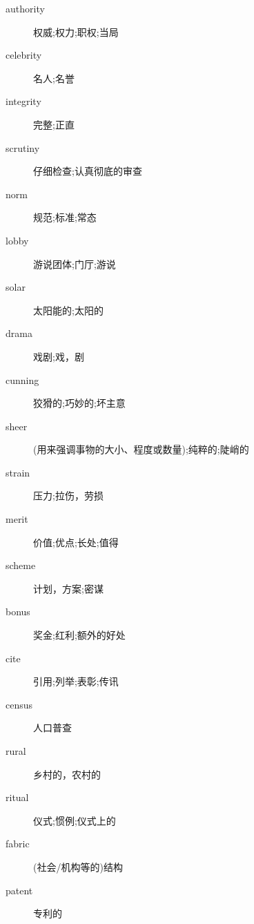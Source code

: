 \documentclass[a4paper, 10pt]{ctexart}
\begin{document}
\begin{multicols*}{2}
\begin{description}
\item[authority] 权威;权力;职权;当局

\item[celebrity] 名人;名誉

\item[integrity] 完整;正直

\item[scrutiny] 仔细检查;认真彻底的审查

\item[norm] 规范;标准;常态

\item[lobby] 游说团体;门厅;游说

\item[solar] 太阳能的;太阳的

\item[drama] 戏剧;戏，剧

\item[cunning] 狡猾的;巧妙的;坏主意

\item[sheer] (用来强调事物的大小、程度或数量);纯粹的;陡峭的

\item[strain] 压力;拉伤，劳损

\item[merit] 价值;优点;长处;值得

\item[scheme] 计划，方案;密谋

\item[bonus] 奖金;红利;额外的好处

\item[cite] 引用;列举;表彰;传讯

\item[census] 人口普查

\item[rural] 乡村的，农村的

\item[ritual] 仪式;惯例;仪式上的

\item[fabric] (社会/机构等的)结构

\item[patent] 专利的

    \end{description}
\end{multicols*}
\end{document}
